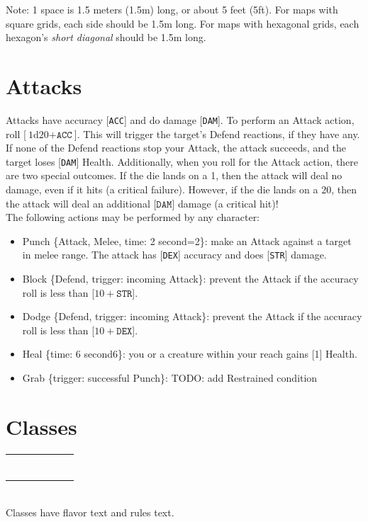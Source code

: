 \documentclass[12pt]{article}
\newcommand{\STR}{\texttt{STR}}
\newcommand{\DEX}{\texttt{DEX}}
\newcommand{\ACC}{\texttt{ACC}}
\newcommand{\DAM}{\texttt{DAM}}
\newcommand{\TIME}[1]{\{time: #1 second\if1#1{}\else{s}\fi\}}
\newcommand{\TRIG}[1]{\{trigger: #1\}}
\newcommand{\MELEE}[1]{\{Attack, Melee, time: #1 second\if1=#1{}\else{s}\fi\}}
\newcommand{\DEFEND}{\{Defend, trigger: incoming Attack\}}
\newcommand{\dice}[2]{\text{#1d#2}}
\begin{document}
Note: 1 space is 1.5 meters (1.5m) long, or about 5 feet (5ft). For maps with square grids, each side should be 1.5m long. For maps with hexagonal grids, each hexagon’s \textit{short diagonal} should be 1.5m long.

\pagebreak
\section{Attacks}

Attacks have accuracy [\ACC] and do damage [\DAM]. To perform an Attack action, roll [$\dice{1}{20} + \ACC$]. This will trigger the target’s Defend reactions, if they have any. If none of the Defend reactions stop your Attack, the attack succeeds, and the target loses [\DAM] Health. Additionally, when you roll for the Attack action, there are two special outcomes. If the die lands on a 1, then the attack will deal no damage, even if it hits (a critical failure). However, if the die lands on a 20, then the attack will deal an additional [$\DAM$] damage (a critical hit)!
\\[5mm]
The following actions may be performed by any character:
\begin{itemize}

\item Punch \MELEE{2}: make an Attack against a target in melee range. The attack has [\DEX] accuracy and does [\STR] damage.

\item Block \DEFEND: prevent the Attack if the accuracy roll is less than [$10 + \STR$].

\item Dodge \DEFEND: prevent the Attack if the accuracy roll is less than [$10 + \DEX$].

\item Heal \TIME{6}: you or a creature within your reach gains [1] Health.

\item Grab \TRIG{successful Punch}: TODO: add Restrained condition

\end{itemize}

\pagebreak
\section{Classes}

\begin{tabularx}{\textwidth}{CCCCCC}
 &  &  &  &  &  \\
 &  &  &  &  &  \\
 &  &  &  &  &  \\
 &  &  &  &  &   \\
 &  &  &  &  &  \\
 &  &  &  &  &  \\
\end{tabularx}
\\[5mm]
Classes have flavor text and rules text.
\end{document}
